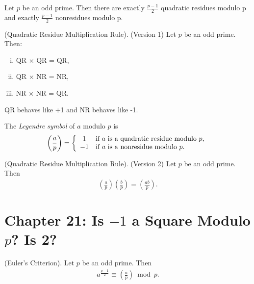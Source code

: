\documentclass[graybox]{svmult}
\begin{document}
\begin{theorem}
Let $p$ be an odd prime. Then there are exactly $\frac{p-1}{2}$ quadratic residues modulo p and exactly $\frac{p-1}{2}$ nonresidues modulo p.
\end{theorem}

\begin{theorem}
(Quadratic Residue Multiplication Rule). (Version 1) Let $p$ be an odd prime. Then:
\begin{enumerate}[(i)]
\item QR $\times$ QR = QR,
\item QR $\times$ NR = NR,
\item NR $\times$ NR = QR.
\end{enumerate}
\end{theorem}

QR behaves like +1 and NR behaves like -1.

\begin{definition}
The \textit{Legendre symbol} of $a$ modulo $p$ is
\begin{align*}
\left(\frac{a}{p}\right) = \left\{
\begin{array}{c l}      
    1 & \text{if $a$ is a quadratic residue modulo $p$,}\\
    -1 & \text{if $a$ is a nonresidue modulo $p$.}
\end{array}\right.
\end{align*}
\end{definition}

\begin{theorem}
(Quadratic Residue Multiplication Rule). (Version 2) Let $p$ be an odd prime. Then
\begin{align*}
\left(\frac{a}{p}\right)\left(\frac{b}{p}\right)=\left(\frac{ab}{p}\right).
\end{align*}
\end{theorem}

\section*{Chapter 21: Is $-1$ a Square Modulo $p$? Is 2?}

\begin{theorem}
(Euler's Criterion). Let $p$ be an odd prime. Then
\begin{align*}
a^{\frac{p-1}{2}} \equiv \left(\frac{a}{p}\right) \bmod p.
\end{align*}
\end{theorem}
\end{document}
